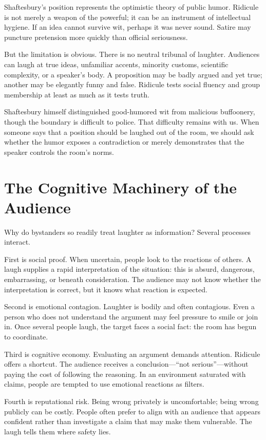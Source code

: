 ﻿\documentclass[12pt,a4paper]{book}
\begin{document}
Shaftesbury's position represents the optimistic theory of public humor. Ridicule is not merely a weapon of the powerful; it can be an instrument of intellectual hygiene. If an idea cannot survive wit, perhaps it was never sound. Satire may puncture pretension more quickly than official seriousness.

But the limitation is obvious. There is no neutral tribunal of laughter. Audiences can laugh at true ideas, unfamiliar accents, minority customs, scientific complexity, or a speaker's body. A proposition may be badly argued and yet true; another may be elegantly funny and false. Ridicule tests social fluency and group membership at least as much as it tests truth.

Shaftesbury himself distinguished good-humored wit from malicious buffoonery, though the boundary is difficult to police. That difficulty remains with us. When someone says that a position should be laughed out of the room, we should ask whether the humor exposes a contradiction or merely demonstrates that the speaker controls the room's norms.

\section{The Cognitive Machinery of the Audience}

Why do bystanders so readily treat laughter as information? Several processes interact.

First is social proof. When uncertain, people look to the reactions of others. A laugh supplies a rapid interpretation of the situation: this is absurd, dangerous, embarrassing, or beneath consideration. The audience may not know whether the interpretation is correct, but it knows what reaction is expected.

Second is emotional contagion. Laughter is bodily and often contagious. Even a person who does not understand the argument may feel pressure to smile or join in. Once several people laugh, the target faces a social fact: the room has begun to coordinate.

Third is cognitive economy. Evaluating an argument demands attention. Ridicule offers a shortcut. The audience receives a conclusion---``not serious''---without paying the cost of following the reasoning. In an environment saturated with claims, people are tempted to use emotional reactions as filters.

Fourth is reputational risk. Being wrong privately is uncomfortable; being wrong publicly can be costly. People often prefer to align with an audience that appears confident rather than investigate a claim that may make them vulnerable. The laugh tells them where safety lies.
\end{document}
